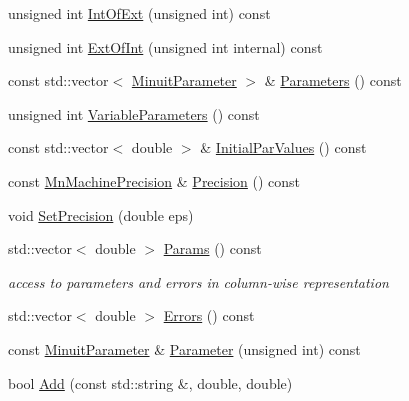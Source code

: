 \begin{DoxyCompactItemize}
\item 
unsigned int \mbox{\hyperlink{classROOT_1_1Minuit2_1_1MnUserTransformation_a69f58a6d486e2a57789cd8a8445cf23d}{Int\+Of\+Ext}} (unsigned int) const
\item 
unsigned int \mbox{\hyperlink{classROOT_1_1Minuit2_1_1MnUserTransformation_a114bf6d4e97b6f8bf5f3788e30e63002}{Ext\+Of\+Int}} (unsigned int internal) const
\item 
const std\+::vector$<$ \mbox{\hyperlink{classROOT_1_1Minuit2_1_1MinuitParameter}{Minuit\+Parameter}} $>$ \& \mbox{\hyperlink{classROOT_1_1Minuit2_1_1MnUserTransformation_a29366e4f3594d0cf3b5d4dc0b1597ad6}{Parameters}} () const
\item 
unsigned int \mbox{\hyperlink{classROOT_1_1Minuit2_1_1MnUserTransformation_a6e88cb38d0d19f4cf9ed3dd8102eebef}{Variable\+Parameters}} () const
\item 
const std\+::vector$<$ double $>$ \& \mbox{\hyperlink{classROOT_1_1Minuit2_1_1MnUserTransformation_a30432dec33ea27b75059a6ce28dfd5cd}{Initial\+Par\+Values}} () const
\item 
const \mbox{\hyperlink{classROOT_1_1Minuit2_1_1MnMachinePrecision}{Mn\+Machine\+Precision}} \& \mbox{\hyperlink{classROOT_1_1Minuit2_1_1MnUserTransformation_af9d893a428a4f4d94dfef1bdd3e9936e}{Precision}} () const
\item 
void \mbox{\hyperlink{classROOT_1_1Minuit2_1_1MnUserTransformation_aa80f289974f19753a2912a8eb6311f53}{Set\+Precision}} (double eps)
\item 
std\+::vector$<$ double $>$ \mbox{\hyperlink{classROOT_1_1Minuit2_1_1MnUserTransformation_a6b95cc35815242b67b6bcc2a37d5e51a}{Params}} () const
\begin{DoxyCompactList}\small\item\em access to parameters and errors in column-\/wise representation \end{DoxyCompactList}\item 
std\+::vector$<$ double $>$ \mbox{\hyperlink{classROOT_1_1Minuit2_1_1MnUserTransformation_af2da240e2a8273a63493847ab518288c}{Errors}} () const
\item 
const \mbox{\hyperlink{classROOT_1_1Minuit2_1_1MinuitParameter}{Minuit\+Parameter}} \& \mbox{\hyperlink{classROOT_1_1Minuit2_1_1MnUserTransformation_a981e9f91d85148fa2d665c7b1aae0f06}{Parameter}} (unsigned int) const
\item 
bool \mbox{\hyperlink{classROOT_1_1Minuit2_1_1MnUserTransformation_a2ddcd7b0cc5234b386407d7a76db1720}{Add}} (const std\+::string \&, double, double)
\item 

\end{DoxyCompactItemize}
